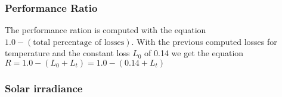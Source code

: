 \subsubsection{Performance Ratio}
The performance ration is computed with the equation $1.0 - (\text{total percentage of losses})$.
With the previous computed losses for temperature and the constant loss $L_0$ of 0.14 we get the equation $R = 1.0 - (L_0 + L_t) = 1.0 - (0.14 + L_t)$
\subsubsection{Solar irradiance}